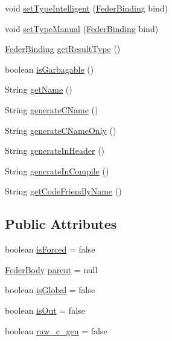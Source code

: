 \begin{DoxyCompactItemize}
void \hyperlink{classfeder_1_1types_1_1FederObject_a45257f7c53f6959f12bf85b32137772b}{set\+Type\+Intelligent} (\hyperlink{classfeder_1_1types_1_1FederBinding}{Feder\+Binding} bind)
\item 
void \hyperlink{classfeder_1_1types_1_1FederObject_a474b468bf57e328bcc31b10a2e2cb346}{set\+Type\+Manual} (\hyperlink{classfeder_1_1types_1_1FederBinding}{Feder\+Binding} bind)
\item 
\hyperlink{classfeder_1_1types_1_1FederBinding}{Feder\+Binding} \hyperlink{classfeder_1_1types_1_1FederObject_a6eb6a31ce2468538288aac6aa0cca06a}{get\+Result\+Type} ()
\item 
boolean \hyperlink{classfeder_1_1types_1_1FederObject_a2d4a3bbd8a43871e08b9fe418a3ce2ad}{is\+Garbagable} ()
\item 
String \hyperlink{classfeder_1_1types_1_1FederObject_afced6ab112045e9757c40bd06ac6413c}{get\+Name} ()
\item 
String \hyperlink{classfeder_1_1types_1_1FederObject_a455578a3f7a79b56512c7a6eeebe676c}{generate\+C\+Name} ()
\item 
String \hyperlink{classfeder_1_1types_1_1FederObject_ada1a393c691be4b1cded1a59936d58af}{generate\+C\+Name\+Only} ()
\item 
String \hyperlink{classfeder_1_1types_1_1FederObject_a4e813a7bd196036c8754ef35bcffbfef}{generate\+In\+Header} ()
\item 
String \hyperlink{classfeder_1_1types_1_1FederObject_abd2747e5a73af451a3280fecb1afa12b}{generate\+In\+Compile} ()
\item 
String \hyperlink{classfeder_1_1types_1_1FederObject_ab606323254677bef8b0b1afe1377e073}{get\+Code\+Friendly\+Name} ()
\end{DoxyCompactItemize}
\subsection*{Public Attributes}
\begin{DoxyCompactItemize}
\item 
boolean \hyperlink{classfeder_1_1types_1_1FederObject_ae0f93d5fc5f91116c42ec7818470d87b}{is\+Forced} = false
\item 
\hyperlink{classfeder_1_1types_1_1FederBody}{Feder\+Body} \hyperlink{classfeder_1_1types_1_1FederObject_a20004c8220590134967231ab27d55b03}{parent} = null
\item 
boolean \hyperlink{classfeder_1_1types_1_1FederObject_a1779800250bc3af84e2c49def2cad2d4}{is\+Global} = false
\item 
boolean \hyperlink{classfeder_1_1types_1_1FederObject_a195c2873c269f7719e727ddf7af62996}{is\+Out} = false
\item 
boolean \hyperlink{classfeder_1_1types_1_1FederObject_a506fd435faadb7ca7e9a79e64d998acd}{raw\+\_\+c\+\_\+gen} = false
\end{DoxyCompactItemize}
